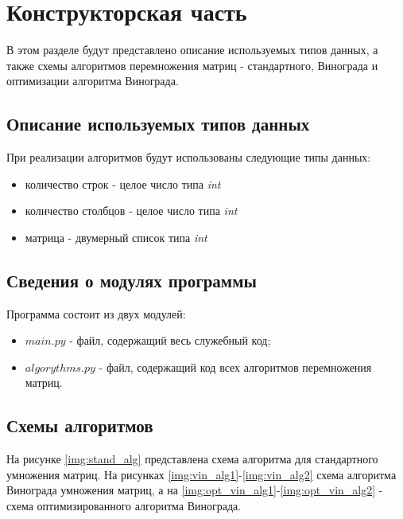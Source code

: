 \chapter{Конструкторская часть}
В этом разделе будут представлено описание используемых типов данных, а также схемы алгоритмов перемножения матриц - стандартного, Винограда и оптимизации алгоритма Винограда.

\section{Описание используемых типов данных}

При реализации алгоритмов будут использованы следующие типы данных:

\begin{itemize}
	\item количество строк - целое число типа \textit{int}
	\item количество столбцов - целое число типа \textit{int}
	\item матрица - двумерный список типа \textit{int}
\end{itemize}


\section{Сведения о модулях программы}
Программа состоит из двух модулей:
\begin{itemize}
	\item $main.py$ - файл, содержащий весь служебный код;
    \item $algorythms.py$ - файл, содержащий код всех алгоритмов перемножения матриц. \newline
\end{itemize}


\section{Схемы алгоритмов}
На рисунке \ref{img:stand_alg} представлена схема алгоритма для стандартного умножения матриц. На рисунках \ref{img:vin_alg1}-\ref{img:vin_alg2} схема алгоритма Винограда умножения матриц, а на \ref{img:opt_vin_alg1}-\ref{img:opt_vin_alg2} - схема оптимизированного алгоритма Винограда. 


